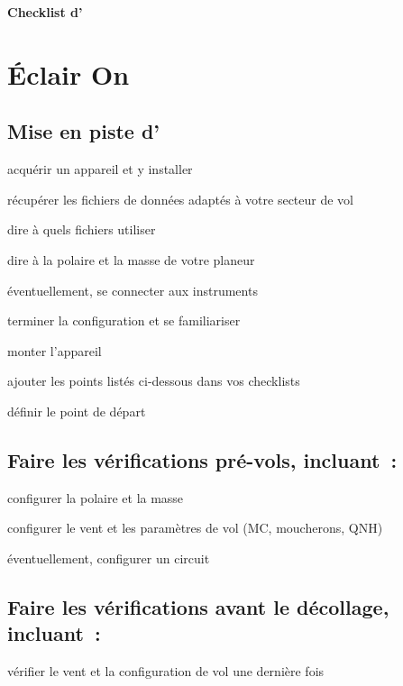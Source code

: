 \documentclass[french, a4paper, 12pt]{refrep}
\begin{document}
\begin{center}
{\Huge\textbf{Checklist d'\xc}}
\end{center}
\section*{Éclair \textcolor{flashyellow}{On}}\label{ch:flashon}

\subsection{\textcolor{flashblue}{Mise en piste d'\xc}}
\begin{compactitem}
\item acquérir un appareil et y installer \xc
\item récupérer les fichiers de données adaptés à votre secteur de vol
\item dire à \xc{} quels fichiers utiliser
\item dire à \xc{} la polaire et la masse de votre planeur
\item éventuellement, se connecter aux instruments
\item terminer la configuration et se familiariser
\item monter l'appareil
\item ajouter les points listés ci-dessous dans vos checklists
\item définir le point de départ
\end{compactitem}

\subsection*{\textcolor{flashblue}{Faire les vérifications pré-vols, incluant~:}}
\begin{compactitem}
\item configurer la polaire et la masse
\item configurer le vent et les paramètres de vol (MC, moucherons, QNH)
\item éventuellement, configurer un circuit
\end{compactitem}

\subsection*{\textcolor{flashblue}{Faire les vérifications avant le décollage, incluant~:}}
\begin{compactitem}
\item vérifier le vent et la configuration de vol une dernière fois
\end{compactitem}
\end{document}
